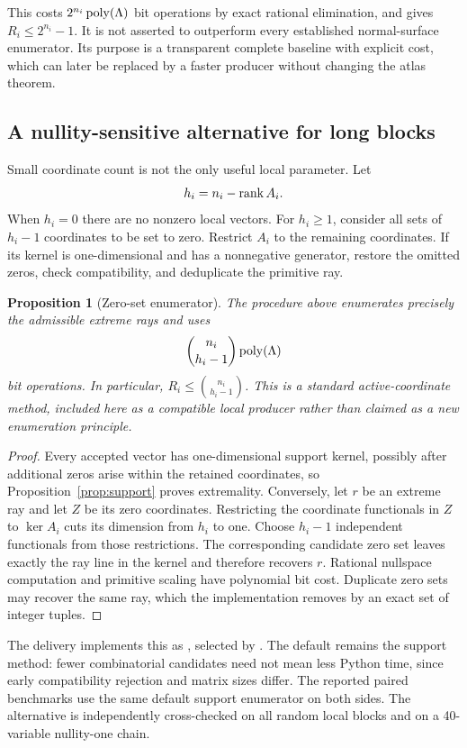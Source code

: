 \documentclass[11pt,a4paper]{article}
\newtheorem{proposition}[theorem]{Proposition}
\theoremstyle{definition}
\theoremstyle{remark}
\begin{document}
This costs $2^{n_i}\operatorname{poly}(\Lambda)$ bit operations by exact rational elimination, and gives $R_i\le2^{n_i}-1$. It is not asserted to outperform every established normal-surface enumerator. Its purpose is a transparent complete baseline with explicit cost, which can later be replaced by a faster producer without changing the atlas theorem.

\subsection{A nullity-sensitive alternative for long blocks}
Small coordinate count is not the only useful local parameter. Let
\[
 h_i=n_i-\operatorname{rank} A_i.
\]
When $h_i=0$ there are no nonzero local vectors. For $h_i\ge1$, consider all sets of $h_i-1$ coordinates to be set to zero. Restrict $A_i$ to the remaining coordinates. If its kernel is one-dimensional and has a nonnegative generator, restore the omitted zeros, check compatibility, and deduplicate the primitive ray.

\begin{proposition}[Zero-set enumerator]
\label{prop:zeros}
The procedure above enumerates precisely the admissible extreme rays and uses
\[
 \binom{n_i}{h_i-1}\operatorname{poly}(\Lambda)
\]
bit operations. In particular, $R_i\le\binom{n_i}{h_i-1}$. This is a standard active-coordinate method, included here as a compatible local producer rather than claimed as a new enumeration principle.
\end{proposition}
\begin{proof}
Every accepted vector has one-dimensional support kernel, possibly after additional zeros arise within the retained coordinates, so Proposition~\ref{prop:support} proves extremality. Conversely, let $r$ be an extreme ray and let $Z$ be its zero coordinates. Restricting the coordinate functionals in $Z$ to $\ker A_i$ cuts its dimension from $h_i$ to one. Choose $h_i-1$ independent functionals from those restrictions. The corresponding candidate zero set leaves exactly the ray line in the kernel and therefore recovers $r$. Rational nullspace computation and primitive scaling have polynomial bit cost. Duplicate zero sets may recover the same ray, which the implementation removes by an exact set of integer tuples.
\end{proof}

The delivery implements this as , selected by . The default remains the support method: fewer combinatorial candidates need not mean less Python time, since early compatibility rejection and matrix sizes differ. The reported paired benchmarks use the same default support enumerator on both sides. The alternative is independently cross-checked on all random local blocks and on a 40-variable nullity-one chain.
\end{document}
